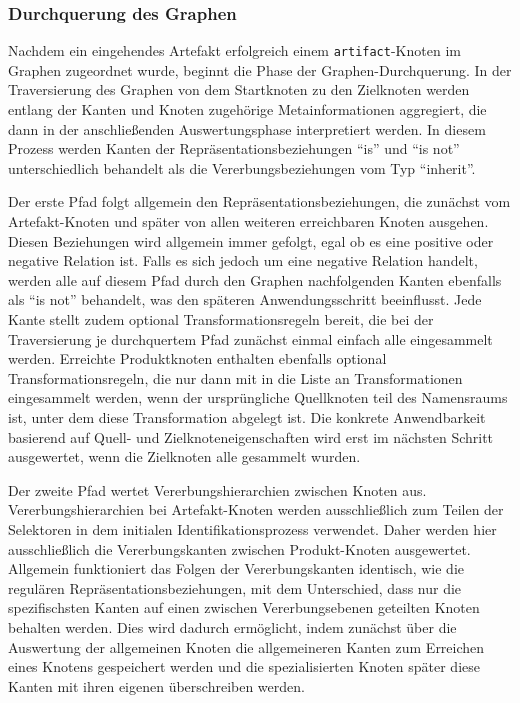 \subsubsection{Durchquerung des Graphen}\label{subsubsec:model-traversal}

Nachdem ein eingehendes Artefakt erfolgreich einem \texttt{artifact}-Knoten im Graphen zugeordnet wurde, beginnt die Phase der Graphen-Durchquerung.
In der Traversierung des Graphen von dem Startknoten zu den Zielknoten werden entlang der Kanten und Knoten zugehörige Metainformationen aggregiert, die dann in der anschließenden Auswertungsphase interpretiert werden.
In diesem Prozess werden Kanten der Repräsentationsbeziehungen \enquote{is} und \enquote{is not} unterschiedlich behandelt als die Vererbungsbeziehungen vom Typ \enquote{inherit}.

Der erste Pfad folgt allgemein den Repräsentationsbeziehungen, die zunächst vom Artefakt-Knoten und später von allen weiteren erreichbaren Knoten ausgehen.
Diesen Beziehungen wird allgemein immer gefolgt, egal ob es eine positive oder negative Relation ist.
Falls es sich jedoch um eine negative Relation handelt, werden alle auf diesem Pfad durch den Graphen nachfolgenden Kanten ebenfalls als \enquote{is not} behandelt, was den späteren Anwendungsschritt beeinflusst.
Jede Kante stellt zudem optional Transformationsregeln bereit, die bei der Traversierung je durchquertem Pfad zunächst einmal einfach alle eingesammelt werden.
Erreichte Produktknoten enthalten ebenfalls optional Transformationsregeln, die nur dann mit in die Liste an Transformationen eingesammelt werden, wenn der ursprüngliche Quellknoten teil des Namensraums ist, unter dem diese Transformation abgelegt ist.
Die konkrete Anwendbarkeit basierend auf Quell- und Zielknoteneigenschaften wird erst im nächsten Schritt ausgewertet, wenn die Zielknoten alle gesammelt wurden.

Der zweite Pfad wertet Vererbungshierarchien zwischen Knoten aus.
Vererbungshierarchien bei Artefakt-Knoten werden ausschließlich zum Teilen der Selektoren in dem initialen Identifikationsprozess verwendet.
Daher werden hier ausschließlich die Vererbungskanten zwischen Produkt-Knoten ausgewertet.
Allgemein funktioniert das Folgen der Vererbungskanten identisch, wie die regulären Repräsentationsbeziehungen, mit dem Unterschied, dass nur die spezifischsten Kanten auf einen zwischen Vererbungsebenen geteilten Knoten behalten werden.
Dies wird dadurch ermöglicht, indem zunächst über die Auswertung der allgemeinen Knoten die allgemeineren Kanten zum Erreichen eines Knotens gespeichert werden und die spezialisierten Knoten später diese Kanten mit ihren eigenen überschreiben werden.

